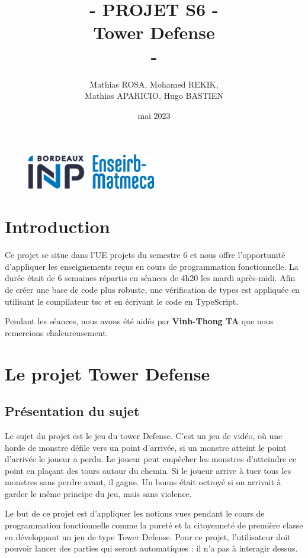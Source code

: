 \documentclass[french]{article}
\title{\textsc{ - PROJET S6 -} \\ Tower Defense \\ \textsc{ - } }
\author{Mathias ROSA, Mohamed REKIK,\\ Mathias APARICIO, Hugo BASTIEN}
\date{mai 2023}
\begin{document}
\maketitle
\vspace{10cm}
\begin{figure}[ht]
    \centering
    \includegraphics[width=0.5\textwidth]{logo_emmk.jpg}
    \label{fig:logo_emmk}
\end{figure}

\newpage

\tableofcontents

\newpage
\section{Introduction}
Ce projet se situe dans l'UE projets du semestre 6 et nous offre l'opportunité d'appliquer les enseignements reçus en cours de  programmation fonctionnelle. La durée était de 6 semaines répartis en séances de 4h20 les mardi après-midi.
Afin de créer une base de code plus robuste, une vérification de types est appliquée en utilisant le compilateur tsc et en écrivant le code en TypeScript.

Pendant les séances, nous avons été aidés par \textbf{Vinh-Thong TA} que nous remercions chaleureusement.
\section{Le projet Tower Defense}


\subsection{Présentation du sujet}


Le sujet du projet est le jeu du tower Defense. C'est un jeu de vidéo, où une horde de monstre défile vers un point d'arrivée, si un monstre atteint le point d'arrivée le joueur a perdu. Le joueur peut empêcher les monstres d'atteindre ce point en plaçant des tours autour du chemin. 
Si le joueur arrive à tuer tous les monstres sans perdre avant, il gagne. Un bonus était octroyé si on arrivait à garder le même principe du jeu, mais sans violence.

Le but de ce projet est d'appliquer les notions vues pendant le cours de programmation fonctionnelle comme la pureté et la citoyenneté de première classe en développant un jeu de type Tower Defense.
Pour ce projet, l'utilisateur doit pouvoir lancer des parties qui seront automatiques : il n'a pas à interagir dessus.
\end{document}
